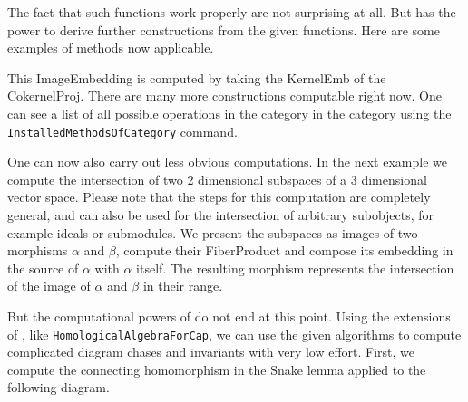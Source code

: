 \begin{small}

\end{small}

The fact that such functions work properly are not surprising at all. But \CapPkg has the power to derive
further constructions from the given functions. Here are some examples of methods now applicable.

\begin{small}

\end{small}

This \textrm{ImageEmbedding} is computed by taking the \textrm{KernelEmb} of the \textrm{CokernelProj}.
There are many more constructions computable right now. One can see a list of all possible operations in the category
in the category using the \texttt{InstalledMethodsOfCategory} command.

\begin{small}

\end{small}

One can now also carry out less obvious computations. In the next example we compute the intersection of two 2 dimensional
subspaces of a 3 dimensional vector space. Please note that the steps for this computation are completely general, and
can also be used for the intersection of arbitrary subobjects, for example ideals or submodules. We present the
subspaces as images of two morphisms $\alpha$ and $\beta$, compute their \textrm{FiberProduct} and compose its embedding
in the source of $\alpha$ with $\alpha$ itself. The resulting morphism represents the intersection of the image of $\alpha$
and $\beta$ in their range.

\begin{small}
 
\end{small}

But the computational powers of \CapPkg do not end at this point. Using the extensions of \CapPkg, like \texttt{HomologicalAlgebraForCap},
we can use the given algorithms to compute complicated diagram chases and invariants with very low effort. First,
we compute the connecting homomorphism in the Snake lemma applied to the following diagram.

